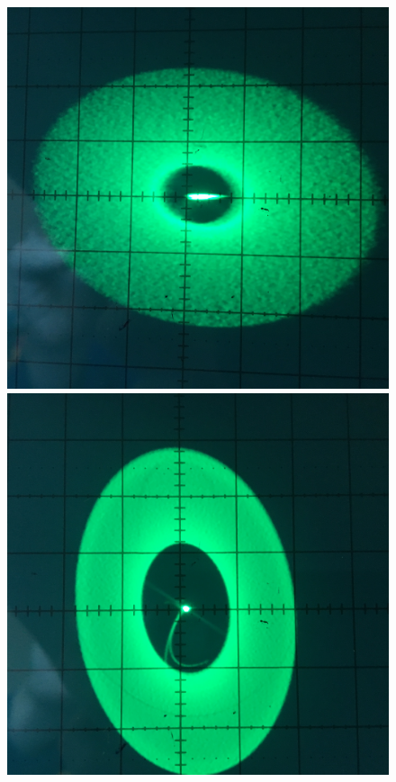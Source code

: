 \begin{figure}[h!]
	\centering
	\vspace{-10pt}
	\begin{minipage}{0.32\linewidth}
	\includegraphics[width=\linewidth]{photo/task3b(mids).jpg}
	\end{minipage}
	\begin{minipage}{0.32\linewidth}
	\includegraphics[width=\linewidth]{photo/task3b(midm).jpg}

\end{minipage}
\end{figure}
